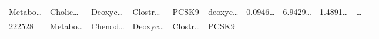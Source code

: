 \documentclass[
]{article}
\begin{document}
\begin{longtable}[]{@{}lllllllllll@{}}
\begin{minipage}[t]{0.07\columnwidth}
Metabo\ldots{}\strut
\end{minipage} & \begin{minipage}[t]{0.07\columnwidth}\raggedright
Cholic\ldots{}\strut
\end{minipage} & \begin{minipage}[t]{0.09\columnwidth}\raggedright
Deoxyc\ldots{}\strut
\end{minipage} & \begin{minipage}[t]{0.07\columnwidth}\raggedright
Clostr\ldots{}\strut
\end{minipage} & \begin{minipage}[t]{0.07\columnwidth}\raggedright
PCSK9\strut
\end{minipage} & \begin{minipage}[t]{0.09\columnwidth}\raggedright
deoxyc\ldots{}\strut
\end{minipage} & \begin{minipage}[t]{0.07\columnwidth}\raggedright
0.0946\ldots{}\strut
\end{minipage} & \begin{minipage}[t]{0.07\columnwidth}\raggedright
6.9429\ldots{}\strut
\end{minipage} & \begin{minipage}[t]{0.07\columnwidth}\raggedright
1.4891\ldots{}\strut
\end{minipage} & \begin{minipage}[t]{0.03\columnwidth}\raggedright
\ldots{}\strut
\end{minipage}\tabularnewline
\begin{minipage}[t]{0.05\columnwidth}\raggedright
222528\strut
\end{minipage} & \begin{minipage}[t]{0.07\columnwidth}\raggedright
Metabo\ldots{}\strut
\end{minipage} & \begin{minipage}[t]{0.07\columnwidth}\raggedright
Chenod\ldots{}\strut
\end{minipage} & \begin{minipage}[t]{0.09\columnwidth}\raggedright
Deoxyc\ldots{}\strut
\end{minipage} & \begin{minipage}[t]{0.07\columnwidth}\raggedright
Clostr\ldots{}\strut
\end{minipage} & \begin{minipage}[t]{0.07\columnwidth}\raggedright
PCSK9\strut
\end{minipage} & \begin{minipage}[t]{0.09\columnwidth}\raggedright

\end{minipage}
\end{longtable}
\end{document}
